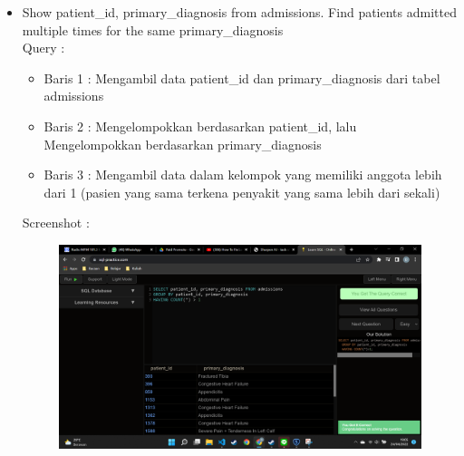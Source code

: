 \documentclass[]{article}
\begin{document}
\begin{itemize}
        \item Show patient\_id, primary\_diagnosis from admissions. Find patients admitted multiple times for the same primary\_diagnosis
        \\Query :
        
        \begin{itemize}
            \item Baris 1 : Mengambil data patient\_id dan primary\_diagnosis dari tabel admissions
            \item Baris 2 : Mengelompokkan berdasarkan patient\_id, lalu Mengelompokkan berdasarkan primary\_diagnosis
            \item Baris 3 : Mengambil data dalam kelompok yang memiliki anggota lebih dari 1 (pasien yang sama terkena penyakit yang sama lebih dari sekali)
        \end{itemize}
        \pagebreak
        Screenshot :
        \begin{figure}[h]
            \includegraphics[scale=0.3]{./Screenshot/Medium-8.png}
            \centering
        \end{figure}


\end{itemize}
\end{document}
